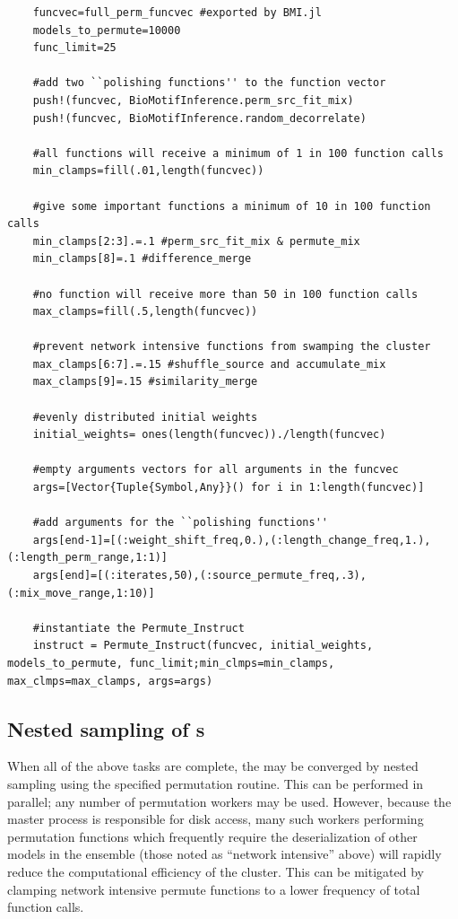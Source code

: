\documentclass{ut-thesis}
\begin{document}
\begin{NoHyper}
\begin{verbatim}
    funcvec=full_perm_funcvec #exported by BMI.jl
    models_to_permute=10000
    func_limit=25

    #add two ``polishing functions'' to the function vector
    push!(funcvec, BioMotifInference.perm_src_fit_mix) 
    push!(funcvec, BioMotifInference.random_decorrelate)

    #all functions will receive a minimum of 1 in 100 function calls
    min_clamps=fill(.01,length(funcvec))

    #give some important functions a minimum of 10 in 100 function calls
    min_clamps[2:3].=.1 #perm_src_fit_mix & permute_mix
    min_clamps[8]=.1 #difference_merge

    #no function will receive more than 50 in 100 function calls
    max_clamps=fill(.5,length(funcvec))

    #prevent network intensive functions from swamping the cluster
    max_clamps[6:7].=.15 #shuffle_source and accumulate_mix
    max_clamps[9]=.15 #similarity_merge

    #evenly distributed initial weights
    initial_weights= ones(length(funcvec))./length(funcvec)

    #empty arguments vectors for all arguments in the funcvec
    args=[Vector{Tuple{Symbol,Any}}() for i in 1:length(funcvec)]

    #add arguments for the ``polishing functions''
    args[end-1]=[(:weight_shift_freq,0.),(:length_change_freq,1.),(:length_perm_range,1:1)]
    args[end]=[(:iterates,50),(:source_permute_freq,.3),(:mix_move_range,1:10)]

    #instantiate the Permute_Instruct
    instruct = Permute_Instruct(funcvec, initial_weights, models_to_permute, func_limit;min_clmps=min_clamps, max_clmps=max_clamps, args=args)
\end{verbatim}

\subsection{Nested sampling of \protect{}s}

When all of the above tasks are complete, the  may be converged by nested sampling using the specified permutation routine. This can be performed in parallel; any number of permutation workers may be used. However, because the master process is responsible for disk access, many such workers performing permutation functions which frequently require the deserialization of other models in the ensemble (those noted as ``network intensive'' above) will rapidly reduce the computational efficiency of the cluster. This can be mitigated by clamping network intensive permute functions to a lower frequency of total function calls.


\end{NoHyper}
\end{document}
